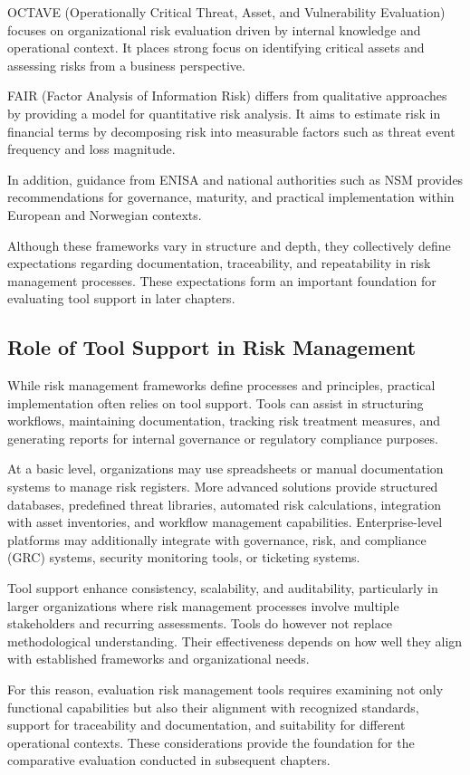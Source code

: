 OCTAVE (Operationally Critical Threat, Asset, and Vulnerability Evaluation) focuses on organizational risk evaluation driven by internal knowledge and operational context. It places strong focus on identifying critical assets and assessing risks from a business perspective.

FAIR (Factor Analysis of Information Risk) differs from qualitative approaches by providing a model for quantitative risk analysis. It aims to estimate risk in financial terms by decomposing risk into measurable factors such as threat event frequency and loss magnitude.

In addition, guidance from ENISA and national authorities such as NSM provides recommendations for governance, maturity, and practical implementation within European and Norwegian contexts.

Although these frameworks vary in structure and depth, they collectively define expectations regarding documentation, traceability, and repeatability in risk management processes. These expectations form an important foundation for evaluating tool support in later chapters.

\subsection{Role of Tool Support in Risk Management}
While risk management frameworks define processes and principles, practical implementation often relies on tool support. Tools can assist in structuring workflows, maintaining documentation, tracking risk treatment measures, and generating reports for internal governance or regulatory compliance purposes.

At a basic level, organizations may use spreadsheets or manual documentation systems to manage risk registers. More advanced solutions provide structured databases, predefined threat libraries, automated risk calculations, integration with asset inventories, and workflow management capabilities. Enterprise-level platforms may additionally integrate with governance, risk, and compliance (GRC) systems, security monitoring tools, or ticketing systems.

Tool support enhance consistency, scalability, and auditability, particularly in larger organizations where risk management processes involve multiple stakeholders and recurring assessments. Tools do however not replace methodological understanding. Their effectiveness depends on how well they align with established frameworks and organizational needs.

For this reason, evaluation risk management tools requires examining not only functional capabilities but also their alignment with recognized standards, support for traceability and documentation, and suitability for different operational contexts. These considerations provide the foundation for the comparative evaluation conducted in subsequent chapters.